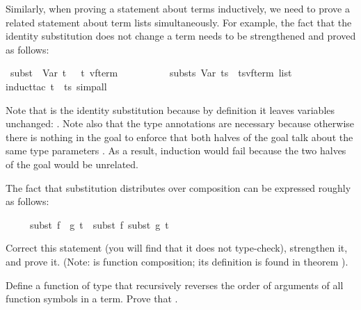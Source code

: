 \begin{isabellebody}
\begin{isamarkuptext}
Similarly, when proving a statement about terms inductively, we need
to prove a related statement about term lists simultaneously. For example,
the fact that the identity substitution does not change a term needs to be
strengthened and proved as follows:%
\end{isamarkuptext}%
\isamarkuptrue%
\ {\isachardoublequote}subst\ \ Var\ t\ \ {\isacharequal}\ {\isacharparenleft}t\ {\isacharcolon}{\isacharcolon}{\isacharparenleft}{\isacharprime}v{\isacharcomma}{\isacharprime}f{\isacharparenright}term{\isacharparenright}\ \ {\isasymand}\isanewline
\ \ \ \ \ \ \ \ substs\ Var\ ts\ {\isacharequal}\ {\isacharparenleft}ts{\isacharcolon}{\isacharcolon}{\isacharparenleft}{\isacharprime}v{\isacharcomma}{\isacharprime}f{\isacharparenright}term\ list{\isacharparenright}{\isachardoublequote}\isanewline
\isamarkupfalse%
induct{\isacharunderscore}tac\ t\ \ ts{\isacharcomma}\ simp{\isacharunderscore}all{\isacharparenright}\isanewline
\isamarkupfalse%
\isamarkupfalse%
%
\begin{isamarkuptext}%
\noindent
Note that  is the identity substitution because by definition it
leaves variables unchanged: . Note also
that the type annotations are necessary because otherwise there is nothing in
the goal to enforce that both halves of the goal talk about the same type
parameters . As a result, induction would fail
because the two halves of the goal would be unrelated.

\begin{exercise}
The fact that substitution distributes over composition can be expressed
roughly as follows:
\begin{isabelle}%
\ \ \ \ \ subst\ {\isacharparenleft}f\ {\isasymcirc}\ g{\isacharparenright}\ t\ {\isacharequal}\ subst\ f\ {\isacharparenleft}subst\ g\ t{\isacharparenright}%
\end{isabelle}
Correct this statement (you will find that it does not type-check),
strengthen it, and prove it. (Note: \isa{{\isasymcirc}} is function composition;
its definition is found in theorem ).
\end{exercise}
\begin{exercise}\label{ex:trev-trev}
  Define a function  of type 
that recursively reverses the order of arguments of all function symbols in a
  term. Prove that .
\end{exercise}


\end{isamarkuptext}
\end{isabellebody}
